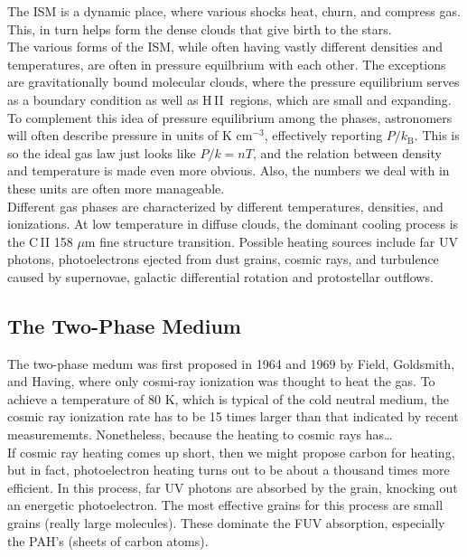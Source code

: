 \documentclass[10pt]{article}
\numberwithin{equation}{section}
\newcommand{\n}{\noindent}
\newcommand{\HII}{H\,II\ }
\begin{document}
\n The ISM is a dynamic place, where various shocks heat, churn, and compress
gas. This, in turn helps form the dense clouds that give birth to the stars.\\

\n The various forms of the ISM, while often having vastly different densities
and temperatures, are often in pressure equilbrium with each other. The
exceptions are gravitationally bound molecular clouds, where the pressure
equilibrium serves as a boundary condition as well as \HII regions, which are
small and expanding. To complement this idea of pressure equilibrium among the
phases, astronomers will often describe pressure in units of K cm$^{-3}$,
effectively reporting $P/k_{\mathrm{B}}$. This is so the ideal gas law just
looks like $P/k = nT$, and the relation between density and temperature is made
even more obvious. Also, the numbers we deal with in these units are often more
manageable.\\

\n Different gas phases are characterized by different temperatures, densities, and ionizations. At low temperature in diffuse clouds, the dominant cooling process is the C\,II 158 $\mu$m fine structure transition. Possible heating sources include far UV photons, photoelectrons ejected from dust grains, cosmic rays, and turbulence caused by supernovae, galactic differential rotation and protostellar outflows.
\subsection{The Two-Phase Medium} %
\label{sub:the_two_phase_medium}
The two-phase medum was first proposed in 1964 and 1969 by Field, Goldsmith, and Having, where only cosmi-ray ionization was thought to heat the gas. To achieve a temperature of 80 K, which is typical of the cold neutral medium, the cosmic ray ionization rate has to be 15 times larger than that indicated by recent measurememts. Nonetheless, because the heating to cosmic rays has\ldots\\

\n If cosmic ray heating comes up short, then we might propose carbon for heating, but in fact, photoelectron heating turns out to be about a thousand times more efficient. In this process, far UV photons are absorbed by the grain, knocking out an energetic photoelectron. The most effective grains for this process are small grains (really large molecules). These dominate the FUV absorption, especially the PAH's (sheets of carbon atoms). 
\end{document}
